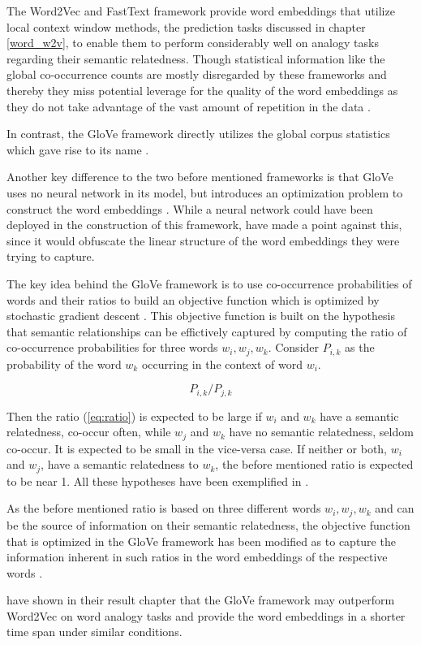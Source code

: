 The Word2Vec and FastText framework provide word embeddings that utilize local context window methods, the prediction tasks discussed in chapter \ref{word_w2v}, to enable them to perform considerably well on analogy tasks regarding their semantic relatedness. Though statistical information like the global co-occurrence counts are mostly disregarded by these frameworks and thereby they miss potential leverage for the quality of the word embeddings as they do not take advantage of the vast amount of repetition in the data \citep{pennington2014glove}.

In contrast, the GloVe framework directly utilizes the global corpus statistics which gave rise to its name \citep{jurafsky2021}.

Another key difference to the two before mentioned frameworks is that GloVe uses no neural network in its model, but introduces an optimization problem to construct the word embeddings \citep{embedding2020pilehvar}.
While a neural network could have been deployed in the construction of this framework, \citet{pennington2014glove} have made a point against this, since it would obfuscate the linear structure of the word embeddings they were trying to capture.

The key idea behind the GloVe framework is to use co-occurrence probabilities of words and their ratios \citep{jurafsky2021} to build an objective function which is optimized by stochastic gradient descent \citep{embedding2020pilehvar}.
This objective function is built on the hypothesis that semantic relationships can be effictively captured by computing the ratio of co-occurrence probabilities for three words $w_i,w_j,w_k$. Consider $P_{i,k}$ as the probability of the word $w_k$ occurring in the context of word $w_i$.

\begin{equation}
    \label{eq:ratio}
    P_{i,k}/P_{j,k}
\end{equation}

Then the ratio (\ref{eq:ratio}) is expected to be large if $w_i$ and $w_k$ have a semantic relatedness, co-occur often, while $w_j$ and $w_k$ have no semantic relatedness, seldom co-occur. It is expected to be small in the vice-versa case. If neither or both, $w_i$ and $w_j$, have a semantic relatedness to $w_k$, the before mentioned ratio is expected to be near 1. All these hypotheses have been exemplified in \citet{pennington2014glove}.

As the before mentioned ratio is based on three different words $w_i,w_j,w_k$ and can be the source of information on their semantic relatedness, the objective function that is optimized in the GloVe framework has been modified as to capture the information inherent in such ratios in the word embeddings of the respective words \citep{pennington2014glove}.

\citet{pennington2014glove} have shown in their result chapter that the GloVe framework may outperform Word2Vec on word analogy tasks and provide the word embeddings in a shorter time span under similar conditions.
